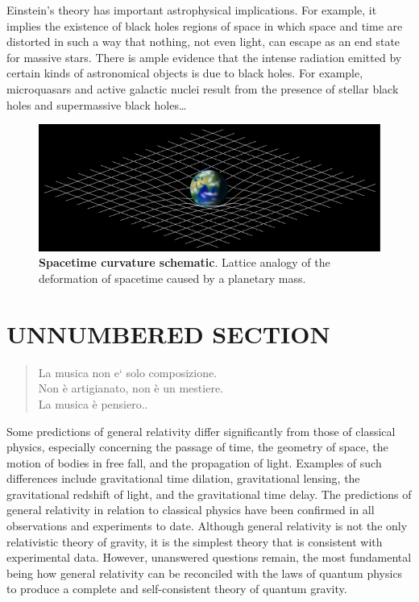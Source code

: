 \documentclass[
	a4paper,
	twocolumn
	]{article}
\begin{document}
Einstein's theory has important astrophysical implications. For example, it
implies the existence of black holes regions of space in which space and time
are distorted in such a way that nothing, not even light, can escape as an
end state for massive stars. There is ample evidence that the intense radiation
emitted by certain kinds of astronomical objects is due to black holes. For
example, microquasars and active galactic nuclei result from the presence of
stellar black holes and supermassive black holes\ldots


\vfill\null

\begin{figure}[b]
\begin{center}
\includegraphics[width=.47\textwidth]{img/image1.png}
\caption{\textbf{Spacetime curvature schematic}. Lattice analogy of the deformation
of spacetime caused by a planetary mass.}
\label{gr01}
\end{center}
\end{figure}

\newpage %
\section*{UNNUMBERED SECTION}

\begin{quote}
La musica non e` solo composizione. \\
Non è artigianato, non è un mestiere. \\
La musica è pensiero.\cite{nono85}.
\end{quote}

Some predictions of general relativity differ significantly from those of
classical physics, especially concerning the passage of time, the geometry of
space, the motion of bodies in free fall, and the propagation of light. Examples
of such differences include gravitational time dilation, gravitational lensing,
the gravitational redshift of light, and the gravitational time delay. The
predictions of general relativity in relation to classical physics have been
confirmed in all observations and experiments to date. Although general
relativity is not the only relativistic theory of gravity, it is the simplest
theory that is consistent with experimental data. However, unanswered questions
remain, the most fundamental being how general relativity can be reconciled with
the laws of quantum physics to produce a complete and self-consistent theory of
quantum gravity.
\end{document}
